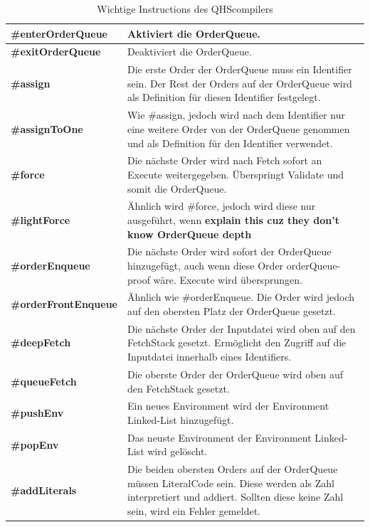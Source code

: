 \begin{table}[H]
    \centering
    \caption{Wichtige Instructions des QHScompilers}
    \label{tab:important_instructions}
    \vspace{3mm} %
    
    \begin{tabularx}{\textwidth}{l|X}
    \textbf{\#enterOrderQueue}      & Aktiviert die OrderQueue. \\ \hline
    \textbf{\#exitOrderQueue}       & Deaktiviert die OrderQueue. \\ \hline
    \textbf{\#assign}               & Die erste Order der OrderQueue muss ein Identifier sein. Der Rest der Orders auf der OrderQueue wird als Definition für diesen Identifier festgelegt. \\ \hline
    \textbf{\#assignToOne}          & Wie \#assign, jedoch wird nach dem Identifier nur eine weitere Order von der OrderQueue genommen und als Definition für den Identifier verwendet. \\ \hline
    \textbf{\#force}                & Die nächste Order wird nach Fetch sofort an Execute weitergegeben. Überspringt Validate und somit die OrderQueue. \\ \hline
    \textbf{\#lightForce}           & Ähnlich wird \#force, jedoch wird diese nur ausgeführt, wenn \textbf{explain this cuz they don't know OrderQueue depth} \\ \hline
    \textbf{\#orderEnqueue}         & Die nächste Order wird sofort der OrderQueue hinzugefügt, auch wenn diese Order orderQueue-proof wäre. Execute wird übersprungen. \\ \hline
    \textbf{\#orderFrontEnqueue}    & Ähnlich wie \#orderEnqueue. Die Order wird jedoch auf den obersten Platz der OrderQueue gesetzt. \\ \hline
    \textbf{\#deepFetch}            & Die nächste Order der Inputdatei wird oben auf den FetchStack gesetzt. Ermöglicht den Zugriff auf die Inputdatei innerhalb eines Identifiers. \\ \hline
    \textbf{\#queueFetch}           & Die oberste Order der OrderQueue wird oben auf den FetchStack gesetzt. \\ \hline 
    \textbf{\#pushEnv}              & Ein neues Environment wird der Environment Linked-List hinzugefügt. \\ \hline
    \textbf{\#popEnv}               & Das neuste Environment der Environment Linked-List wird gelöscht. \\ \hline
    \textbf{\#addLiterals}          & Die beiden obersten Orders auf der OrderQueue müssen LiteralCode sein. Diese werden als Zahl interpretiert und addiert. Sollten diese keine Zahl sein, wird ein Fehler gemeldet.        
    \end{tabularx}
\end{table}

